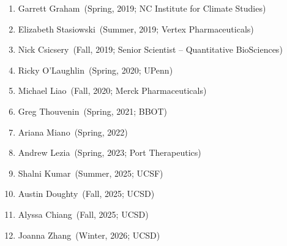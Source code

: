 \begin{enumerate}
\item Garrett Graham~(Spring, 2019; NC Institute for Climate Studies)
\item Elizabeth Stasiowski~(Summer, 2019; Vertex Pharmaceuticals)
\item Nick Csicsery~(Fall, 2019; Senior Scientist -- Quantitative BioSciences)
\item Ricky O'Laughlin~(Spring, 2020; UPenn)
\item Michael Liao~(Fall, 2020; Merck Pharmaceuticals)
\item Greg Thouvenin~(Spring, 2021; BBOT)
\item Ariana Miano~(Spring, 2022)
\item Andrew Lezia~(Spring, 2023; Port Therapeutics)
\item Shalni Kumar~(Summer, 2025; UCSF)
\item Austin Doughty~(Fall, 2025; UCSD)
\item Alyssa Chiang~(Fall, 2025; UCSD)
\item Joanna Zhang~(Winter, 2026; UCSD)

\end{enumerate}
